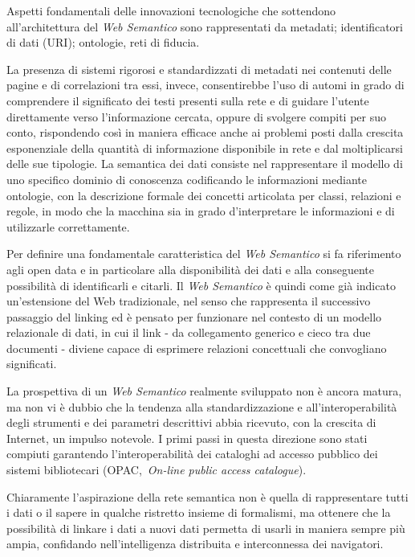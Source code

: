 Aspetti fondamentali delle innovazioni tecnologiche che sottendono
all'architettura del \emph{Web Semantico} sono rappresentati da
metadati; identificatori di dati (URI); ontologie, reti di fiducia.

La presenza di sistemi rigorosi e standardizzati di metadati nei
contenuti delle pagine e di correlazioni tra essi, invece, consentirebbe
l'uso di automi in grado di comprendere il significato dei testi
presenti sulla rete e di guidare l'utente direttamente verso
l'informazione cercata, oppure di svolgere compiti per suo conto,
rispondendo così in maniera efficace anche ai problemi posti dalla
crescita esponenziale della quantità di informazione disponibile in rete
e dal moltiplicarsi delle sue tipologie. La semantica dei dati consiste
nel rappresentare il modello di uno specifico dominio di conoscenza
codificando le informazioni mediante ontologie, con la descrizione
formale dei concetti articolata per classi, relazioni e regole, in modo
che la macchina sia in grado d'interpretare le informazioni e di
utilizzarle correttamente.

Per definire una fondamentale caratteristica del \emph{Web Semantico} si
fa riferimento agli open data e in particolare alla disponibilità dei
dati e alla conseguente possibilità di identificarli e citarli. Il
\emph{Web Semantico} è quindi come già indicato un'estensione del Web
tradizionale, nel senso che rappresenta il successivo passaggio del
linking ed è pensato per funzionare nel contesto di un modello
relazionale di dati, in cui il link - da collegamento generico e cieco
tra due documenti - diviene capace di esprimere relazioni concettuali
che convogliano significati.

La prospettiva di un \emph{Web Semantico} realmente sviluppato non è
ancora matura, ma non vi è dubbio che la tendenza alla standardizzazione
e all'interoperabilità degli strumenti e dei parametri descrittivi abbia
ricevuto, con la crescita di Internet, un impulso notevole. I primi
passi in questa direzione sono stati compiuti garantendo
l'interoperabilità dei cataloghi ad accesso pubblico dei sistemi
bibliotecari (OPAC,~\emph{On-line public access catalogue}).

Chiaramente l'aspirazione della rete semantica non è quella di
rappresentare tutti i dati o il sapere in qualche ristretto insieme di
formalismi, ma ottenere che la possibilità di linkare i dati a nuovi
dati permetta di usarli in maniera sempre più ampia, confidando
nell'intelligenza distribuita e interconnessa dei navigatori.

